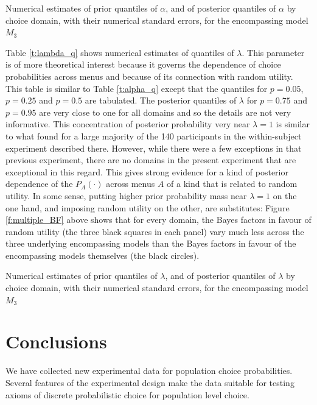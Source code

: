 \documentclass[11pt,letter]{article}
\newcommand{\menus}{menus}
\begin{document}
\begin{table}
  
  \caption{Numerical estimates of prior quantiles of $\alpha$, and of posterior quantiles of $\alpha$ by choice domain, with their numerical standard errors, for the encompassing model $M_3$}
  \label{t:alpha_q}
\end{table}

Table \ref{t:lambda_q} shows numerical estimates of quantiles of $\lambda$.
This parameter is of more theoretical interest because it governs the dependence of choice probabilities across \menus{} and because of its connection with random utility.
This table is similar to Table \ref{t:alpha_q} except that the quantiles for $p=0.05$, $p=0.25$ and $p=0.5$ are tabulated.
The posterior quantiles of $\lambda$ for $p=0.75$ and $p=0.95$ are very close to one for all domains and so the details are not very informative.
This concentration of posterior probability very near $\lambda = 1$ is similar to what  found for a large majority of the 140 participants in the within-subject experiment described there.
However, while there were a few exceptions in that previous experiment, there are no domains in the present experiment that are exceptional in this regard.
This gives strong evidence for a kind of posterior dependence of the $P_A(\cdot)$ across \menus{} $A$ of a kind that is related to random utility.
In some sense, putting higher prior probability mass near $\lambda = 1$ on the one hand, and imposing random utility on the other, are substitutes: Figure \ref{f:multiple_BF} above shows that for every domain, the Bayes factors in favour of random utility (the three black squares in each panel) vary much less across the three underlying encompassing models than the Bayes factors in favour of the encompassing models themselves (the black circles).

\begin{table}
  
  \caption{Numerical estimates of prior quantiles of $\lambda$, and of posterior quantiles of $\lambda$ by choice domain, with their numerical standard errors, for the encompassing model $M_3$}
  \label{t:lambda_q}
\end{table}

\section{Conclusions}\label{s:conclude}

We have collected new experimental data for population choice probabilities.
Several features of the experimental design make the data suitable for testing axioms of discrete probabilistic choice for population level choice.
\end{document}
